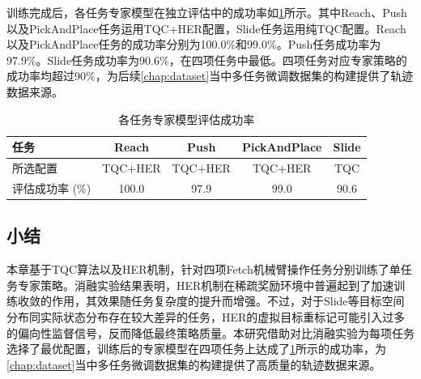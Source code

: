 训练完成后，各任务专家模型在独立评估中的成功率如\cref{tab:expert-success-rate}所示。其中Reach、Push以及PickAndPlace任务运用TQC+HER配置，Slide任务运用纯TQC配置。Reach以及PickAndPlace任务的成功率分别为100.0\%和99.0\%。Push任务成功率为97.9\%。Slide任务成功率为90.6\%，在四项任务中最低。四项任务对应专家策略的成功率均超过90\%，为后续\cref{chap:dataset}当中多任务微调数据集的构建提供了轨迹数据来源。

\begin{table}[htbp]
\centering
\caption{各任务专家模型评估成功率}\label{tab:expert-success-rate}
\begin{tabular}{lcccc}
\toprule
任务 & Reach & Push & PickAndPlace & Slide \\
\midrule
所选配置 & TQC+HER & TQC+HER & TQC+HER & TQC \\
评估成功率 (\%) & 100.0 & 97.9 & 99.0 & 90.6 \\
\bottomrule
\end{tabular}
\end{table}

\subsection{小结}
本章基于TQC算法以及HER机制，针对四项Fetch机械臂操作任务分别训练了单任务专家策略。消融实验结果表明，HER机制在稀疏奖励环境中普遍起到了加速训练收敛的作用，其效果随任务复杂度的提升而增强。不过，对于Slide等目标空间分布同实际状态分布存在较大差异的任务，HER的虚拟目标重标记可能引入过多的偏向性监督信号，反而降低最终策略质量。本研究借助对比消融实验为每项任务选择了最优配置，训练后的专家模型在四项任务上达成了\cref{tab:expert-success-rate}所示的成功率，为\cref{chap:dataset}当中多任务微调数据集的构建提供了高质量的轨迹数据来源。
